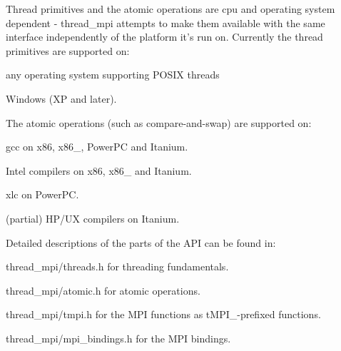 \-Thread primitives and the atomic operations are cpu and operating system dependent -\/ thread\-\_\-mpi attempts to make them available with the same interface independently of the platform it's run on. \-Currently the thread primitives are supported on\-:
\begin{DoxyItemize}
\item any operating system supporting \-P\-O\-S\-I\-X threads
\item \-Windows (\-X\-P and later).
\end{DoxyItemize}

\-The atomic operations (such as compare-\/and-\/swap) are supported on\-:
\begin{DoxyItemize}
\item gcc on x86, x86\-\_, \-Power\-P\-C and \-Itanium.
\item \-Intel compilers on x86, x86\-\_ and \-Itanium.
\item xlc on \-Power\-P\-C.
\item (partial) \-H\-P/\-U\-X compilers on \-Itanium.
\end{DoxyItemize}

\-Detailed descriptions of the parts of the \-A\-P\-I can be found in\-:
\begin{DoxyItemize}
\item thread\-\_\-mpi/threads.\-h for threading fundamentals.
\item thread\-\_\-mpi/atomic.\-h for atomic operations.
\item thread\-\_\-mpi/tmpi.\-h for the \-M\-P\-I functions as t\-M\-P\-I\-\_\--\/prefixed functions.
\item thread\-\_\-mpi/mpi\-\_\-bindings.\-h for the \-M\-P\-I bindings. 
\end{DoxyItemize}